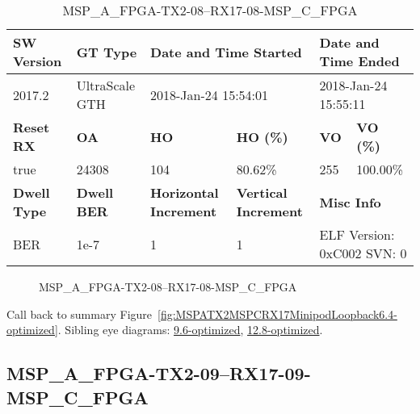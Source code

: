 \begin{table}[h]
\centering
\caption{MSP\_A\_FPGA-TX2-08--RX17-08-MSP\_C\_FPGA}
\label{tab:MSPAFPGATX208RX1708MSPCFPGA6.4-optimized}
\begin{tabular}{@{}|l|l|l|l|l|l|@{}}
\toprule
\textbf{SW Version}                & \textbf{GT Type}   & \multicolumn{2}{l|}{\textbf{Date and Time Started}}            & \multicolumn{2}{l|}{\textbf{Date and Time Ended}}        \\ \midrule
2017.2                       & UltraScale GTH          & \multicolumn{2}{l|}{2018-Jan-24 15:54:01}                   & \multicolumn{2}{l|}{2018-Jan-24 15:55:11}               \\ \midrule
\textbf{Reset RX}                  & \textbf{OA} & \textbf{HO}   & \textbf{HO (\%)} & \textbf{VO} & \textbf{VO (\%)} \\ \midrule
true & 24308        & 104          & 80.62\%        & 255        & 100.00\%       \\ \midrule
\textbf{Dwell Type}                & \textbf{Dwell BER} & \textbf{Horizontal Increment} & \textbf{Vertical Increment}    & \multicolumn{2}{l|}{\textbf{Misc Info}}                  \\ \midrule
BER                            & 1e-7        & 1        & 1           & \multicolumn{2}{l|}{ELF Version: 0xC002 SVN: 0}                         \\ \bottomrule
\end{tabular}
\end{table}

\begin{figure}[h]
\caption{MSP\_A\_FPGA-TX2-08--RX17-08-MSP\_C\_FPGA} \label{fig:MSPAFPGATX208RX1708MSPCFPGA6.4-optimized}
\end{figure}

Call back to summary Figure~\ref{fig:MSPATX2MSPCRX17MinipodLoopback6.4-optimized}.
Sibling eye diagrams: \hyperref[sec:MSPAFPGATX208RX1708MSPCFPGA9.6-optimized]{9.6-optimized}, \hyperref[sec:MSPAFPGATX208RX1708MSPCFPGA12.8-optimized]{12.8-optimized}.

\clearpage
\newpage


\subsection{MSP\_A\_FPGA-TX2-09--RX17-09-MSP\_C\_FPGA}\label{sec:MSPAFPGATX209RX1709MSPCFPGA6.4-optimized}

